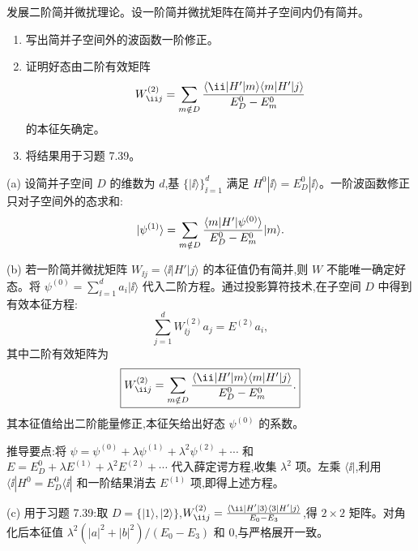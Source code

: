 \begin{question}
发展二阶简并微扰理论。设一阶简并微扰矩阵在简并子空间内仍有简并。
\begin{enumerate}
\item 写出简并子空间外的波函数一阶修正。
\item 证明好态由二阶有效矩阵
\[
W^{(2)}_{\ii j}=\sum_{m\notin D}{\langle \ii|H'|m\rangle\langle m|H'|j\rangle\over E_D^0-E_m^0}
\]
的本征矢确定。
\item 将结果用于习题 7.39。
\end{enumerate}
\end{question}
\begin{solution}
(a) 设简并子空间 $D$ 的维数为 $d$,基 $\{|\ii\rangle\}_{\ii=1}^d$ 满足 $H^0|\ii\rangle=E_D^0|\ii\rangle$。一阶波函数修正只对子空间外的态求和:
\[
|\psi^{(1)}\rangle = \sum_{m\notin D} {\langle m|H'|\psi^{(0)}\rangle\over E_D^0-E_m^0}|m\rangle.
\]

(b) 若一阶简并微扰矩阵 $W_{\ii j}=\langle \ii|H'|j\rangle$ 的本征值仍有简并,则 $W$ 不能唯一确定好态。将 $\psi^{(0)}=\sum_{\ii=1}^d a_i|\ii\rangle$ 代入二阶方程。通过投影算符技术,在子空间 $D$ 中得到有效本征方程:
\[
\sum_{j=1}^d W^{(2)}_{\ii j} a_j = E^{(2)} a_i,
\]
其中二阶有效矩阵为
\[
\boxed{W^{(2)}_{\ii j} = \sum_{m\notin D} {\langle \ii|H'|m\rangle\langle m|H'|j\rangle\over E_D^0 - E_m^0}.}
\]
其本征值给出二阶能量修正,本征矢给出好态 $\psi^{(0)}$ 的系数。

推导要点:将 $\psi=\psi^{(0)}+\lambda\psi^{(1)}+\lambda^2\psi^{(2)}+\cdots$ 和 $E=E_D^0+\lambda E^{(1)}+\lambda^2 E^{(2)}+\cdots$ 代入薛定谔方程,收集 $\lambda^2$ 项。左乘 $\langle \ii|$,利用 $\langle \ii|H^0=E_D^0\langle \ii|$ 和一阶结果消去 $E^{(1)}$ 项,即得上述方程。

(c) 用于习题 7.39:取 $D=\{|1\rangle,|2\rangle\}$,$W^{(2)}_{\ii j}={\langle \ii|H'|3\rangle\langle 3|H'|j\rangle\over E_0-E_3}$,得 $2\times2$ 矩阵。对角化后本征值 $\lambda^2(|a|^2+|b|^2)/(E_0-E_3)$ 和 $0$,与严格展开一致。
\end{solution}


